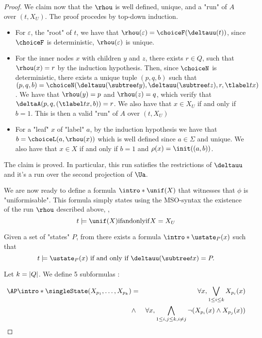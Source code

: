 \documentclass[a4paper,UKenglish,cleveref, autoref, thm-restate]{lipics-v2021}
\begin{document}
\begin{proof}
	We claim now that the $\rhou$ is well defined, unique, and a "run" of $A$ over $(t,X_U)$. The proof procedes by top-down induction.
	\begin{itemize}
		\item For $\varepsilon$, the "root" of $t$, we have that $\rhou(\varepsilon) = \choiceF(\deltauu(t))$, since $\choiceF$ is deterministic, $\rhou(\varepsilon)$ is unique.
		\item For the inner nodes $x$ with children $y$ and $z$, there exists $r \in Q$, such that $\rhou (x) = r$ by the induction hypothesis. Then,
		      since $\choiceN$ is deterministic, there exists a unique tuple $(p,q,b)$ such that
		      $(p,q,b) = \choiceN(\deltauu(\subtree t y), \deltauu(\subtree t z), r, \tlabel t x)$.
		      We have that $\rhou(y) = p$ and $\rhou(z) = q$, which verify that $\deltaA(p,q,(\tlabel t x,b)) = r$. We also have that $x \in X_U$ if and only if $b = 1$.
		      This is then a valid "run" of $A$ over $(t,X_U)$
		\item For a "leaf" $x$ of "label" $a$, by the induction hypothesis we have that $b = \choiceL(a, \rhou(x))$ which is well defined since $a \in \Sigma$ and unique.
		      We also have that $x \in X$ if and only if $b = 1$ and $\rho(x) = \init ((a,b))$.
	\end{itemize}
	The claim is proved. In particular, this run satisfies the restrictions of $\deltauu$ and it's a run over the second projection of $\Ua$.

	\AP We are now ready to define a formula $\intro*\unif (X)$ that witnesses that $\phi$ is "uniformisable".
	This formula simply states using the MSO-syntax the existence of the run $\rhou$ described above, \ie,
	\[  t \models \unif(X)  \tiff X=X_U \]

	\AP Given a set of "states" $P$, from  there exists a formula $\intro* \ustate_P(x)$ such that
	\[ t \models \ustate_P(x) \text{ if and only if } \deltauu(\subtree t x) = P .\]


	Let $k = \left|Q\right|$.
	We define 5 subformulas :

	\begin{eqnarray*}
		\AP \intro* \singleState (X_{p_1}, \ldots, X_{p_k})  &=& \forall x, \bigvee_{1 \leq i \leq k} X_{p_i} (x)\\
		&\land& \forall x, \bigwedge_{1 \leq i, j \leq k, i \neq j} \lnot(X_{p_i} (x) \land X_{p_j}(x))
	\end{eqnarray*}


\end{proof}
\end{document}
